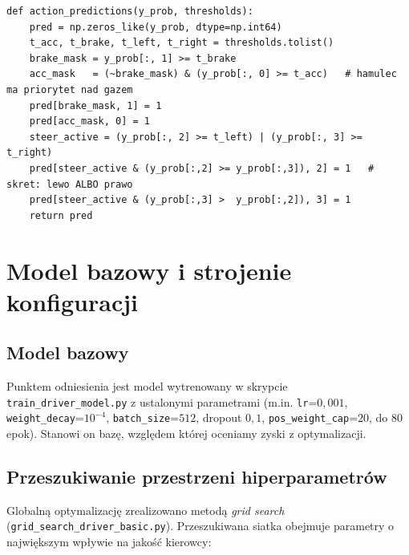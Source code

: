\documentclass[11pt,a4paper]{article}
\begin{document}
\noindent\begin{minipage}{\linewidth}
\begin{lstlisting}[style=py,caption={Zamiana prawdopodobieństw na sterowanie z priorytetem hamowania (fragment \texttt{grid\_search\_driver\_basic.py}).}]
def action_predictions(y_prob, thresholds):
    pred = np.zeros_like(y_prob, dtype=np.int64)
    t_acc, t_brake, t_left, t_right = thresholds.tolist()
    brake_mask = y_prob[:, 1] >= t_brake
    acc_mask   = (~brake_mask) & (y_prob[:, 0] >= t_acc)   # hamulec ma priorytet nad gazem
    pred[brake_mask, 1] = 1
    pred[acc_mask, 0] = 1
    steer_active = (y_prob[:, 2] >= t_left) | (y_prob[:, 3] >= t_right)
    pred[steer_active & (y_prob[:,2] >= y_prob[:,3]), 2] = 1   # skret: lewo ALBO prawo
    pred[steer_active & (y_prob[:,3] >  y_prob[:,2]), 3] = 1
    return pred
\end{lstlisting}
\end{minipage}

\section{Model bazowy i strojenie konfiguracji}
\label{sec:strojenie}

\subsection{Model bazowy}

Punktem odniesienia jest model wytrenowany w skrypcie
\texttt{train\_driver\_\allowbreak model.py} z ustalonymi parametrami (m.in. \texttt{lr}=$0{,}001$, \texttt{weight\_decay}=$10^{-4}$,
\texttt{batch\_size}=$512$, dropout $0{,}1$, \texttt{pos\_weight\_cap}=$20$, do 80 epok).
Stanowi on bazę, względem której oceniamy zyski z optymalizacji.

\subsection{Przeszukiwanie przestrzeni hiperparametrów}

Globalną optymalizację zrealizowano metodą \emph{grid search}
(\texttt{grid\_search\_\allowbreak driver\_basic.py}). Przeszukiwana siatka obejmuje
parametry o największym wpływie na jakość kierowcy:
\end{document}

